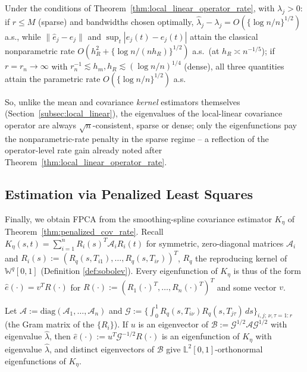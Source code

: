 \begin{corollary}
\label{cor:fpca_local_linear_rates}
Under the conditions of Theorem~\ref{thm:local_linear_operator_rate}, with
$\lambda_j>0$: if $r\leq M$ (sparse) and bandwidths chosen optimally,
$\widehat\lambda_j-\lambda_j=O(\{\log n/n\}^{1/2})$ a.s., while
$\|\widehat{e}_j-e_j\|$ and $\sup_t|\widehat{e}_j(t)-e_j(t)|$ attain the
classical nonparametric rate $O(h_R^2+\{\log n/(nh_R)\}^{1/2})$ a.s.\ (at
$h_R\asymp n^{-1/5}$); if $r=r_n\to\infty$ with $r_n^{-1}\lesssim h_m,h_R
\lesssim(\log n/n)^{1/4}$ (dense), all three quantities attain the
parametric rate $O(\{\log n/n\}^{1/2})$ a.s.
\end{corollary}

So, unlike the mean and covariance \emph{kernel} estimators themselves
(Section~\ref{subsec:local_linear}), the eigenvalues of the local-linear
covariance operator are always $\sqrt{n}$-consistent, sparse or dense; only
the eigenfunctions pay the nonparametric-rate penalty in the sparse
regime -- a reflection of the operator-level rate gain already noted after
Theorem~\ref{thm:local_linear_operator_rate}.

\subsection{Estimation via Penalized Least Squares}
\label{subsec:fpca_pls}

Finally, we obtain FPCA from the smoothing-spline covariance estimator
$K_\eta$ of Theorem~\ref{thm:penalized_cov_rate}. Recall $K_\eta(s,t) =
\sum_{i=1}^nR_i(s)^T\mathcal{A}_iR_i(t)$ for symmetric, zero-diagonal
matrices $\mathcal{A}_i$ and $R_i(s):=(R_q(s,T_{i1}),\dots,R_q(s,T_{ir}))^T$,
$R_q$ the reproducing kernel of $\mathbb{W}^q[0,1]$ (Definition
\ref{def:sobolev}). Every eigenfunction of $K_\eta$ is thus of the form
$\widehat{e}(\cdot)=v^TR(\cdot)$ for $R(\cdot):=(R_1(\cdot)^T,\dots,R_n
(\cdot)^T)^T$ and some vector $v$.

\begin{theorem}
\label{thm:fpca_pls_matrix_form}
Let $\mathcal{A}:=\mathrm{diag}(\mathcal{A}_1,\dots,\mathcal{A}_n)$ and
$\mathcal{G}:=\{\int_0^1R_q(s,T_{i\nu})R_q(s,T_{j\tau})\,ds\}_{i,j;\,\nu,
\tau=1:r}$ (the Gram matrix of the $\{R_i\}$). If $u$ is an eigenvector of
$\mathcal{B}:=\mathcal{G}^{1/2}\mathcal{A}\mathcal{G}^{1/2}$ with eigenvalue
$\widehat\lambda$, then $\widehat{e}(\cdot):=u^T\mathcal{G}^{-1/2}R(\cdot)$
is an eigenfunction of $K_\eta$ with eigenvalue $\widehat\lambda$, and
distinct eigenvectors of $\mathcal{B}$ give $\mathbb{L}^2[0,1]$-orthonormal
eigenfunctions of $K_\eta$.
\end{theorem}

